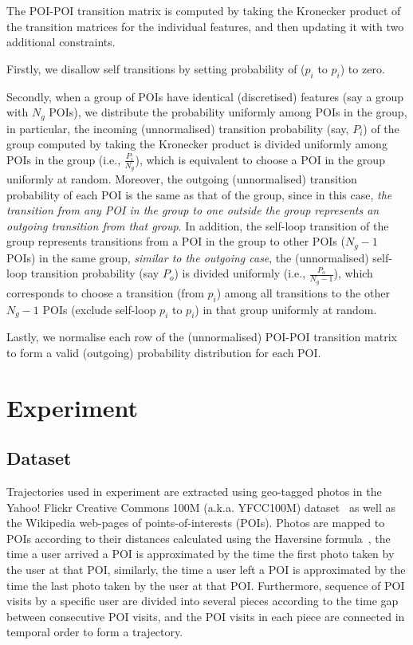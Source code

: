 The POI-POI transition matrix is computed by taking the Kronecker product of the transition matrices for the individual features,
and then updating it with two additional constraints.

Firstly, we disallow self transitions by setting probability of ($p_i$ to $p_i$) to zero.

Secondly, when a group of POIs have identical (discretised) features (say a group with $N_g$ POIs), 
we distribute the probability uniformly among POIs in the group,
in particular, the incoming (unnormalised) transition probability (say, $P_i$) of the group computed by taking the Kronecker product is divided uniformly 
among POIs in the group (i.e., $\frac{P_i}{N_g}$), which is equivalent to choose a POI in the group uniformly at random.
Moreover, the outgoing (unnormalised) transition probability of each POI is the same as that of the group, 
since in this case, \textit{the transition from any POI in the group to one outside the group represents an outgoing transition from that group}.
In addition, the self-loop transition of the group represents transitions from a POI in the group to other POIs ($N_g-1$ POIs) in the same group, 
\textit{similar to the outgoing case}, the (unnormalised) self-loop transition probability (say $P_o$) is divided uniformly (i.e., $\frac{P_o}{N_g-1}$),
which corresponds to choose a transition (from $p_i$) among all transitions to the other $N_g-1$ POIs (exclude self-loop $p_i$ to $p_i$)
in that group uniformly at random.

Lastly, we normalise each row of the (unnormalised) POI-POI transition matrix to form a valid (outgoing) probability distribution for each POI.



\section{Experiment}

\subsection{Dataset}
Trajectories used in experiment are extracted using geo-tagged photos in the Yahoo! Flickr Creative Commons 100M
(a.k.a. YFCC100M) dataset~\cite{thomee2016yfcc100m} as well as the Wikipedia web-pages of points-of-interests (POIs).
Photos are mapped to POIs according to their distances calculated using the Haversine formula~\cite{haversine},
the time a user arrived a POI is approximated by the time the first photo taken by the user at that POI,
similarly, the time a user left a POI is approximated by the time the last photo taken
by the user at that POI.
Furthermore, sequence of POI visits by a specific user are divided into several pieces according to
the time gap between consecutive POI visits, and the POI visits in each piece are connected in temporal order
to form a trajectory.

